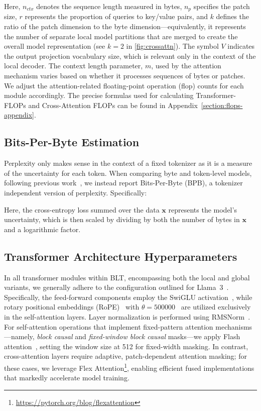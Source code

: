 Here, $n_{ctx}$ denotes the sequence length measured in bytes, $n_p$ specifies the patch size, $r$ represents the proportion of queries to key/value pairs, and $k$ defines the ratio of the patch dimension to the byte dimension—equivalently, it represents the number of separate local model partitions that are merged to create the overall model representation (see $k=2$ in \autoref{fig:crossattn}). The symbol $V$ indicates the output projection vocabulary size, which is relevant only in the context of the local decoder. The context length parameter, $m$, used by the attention mechanism varies based on whether it processes sequences of bytes or patches. We adjust the attention-related floating-point operation (flop) counts for each module accordingly. The precise formulas used for calculating Transformer-FLOPs and Cross-Attention FLOPs can be found in Appendix~\ref{section:flops-appendix}.

\subsection{Bits-Per-Byte Estimation} Perplexity only makes sense in the context of a fixed tokenizer as it is a measure of the uncertainty for each token. When comparing byte and token-level models, following previous work~\citep{xue2022byt5, yu2023megabyte, wang2024mambabyte}, we instead report Bits-Per-Byte (BPB), a tokenizer independent version of perplexity. Specifically:

Here, the cross-entropy loss summed over the data $\pmb{x}$ represents the model’s uncertainty, which is then scaled by dividing by both the number of bytes in $\pmb{x}$ and a logarithmic factor.

\subsection{Transformer Architecture Hyperparameters} In all transformer modules within {\textsc BLT}, encompassing both the local and global variants, we generally adhere to the configuration outlined for Llama~3~\citep{dubey2024llama}. Specifically, the feed-forward components employ the SwiGLU activation~\citep{swiglu}, while rotary positional embeddings (RoPE)~\citep{RoPe} with $\theta=500000$~\citep{xiong2024effective} are utilized exclusively in the self-attention layers. Layer normalization is performed using RMSNorm~\citep{RMSNorm}. For self-attention operations that implement fixed-pattern attention mechanisms—namely, \textit{block causal} and \textit{fixed-window block causal} masks—we apply Flash attention~\citep{dao2022flashattention}, setting the window size at 512 for fixed-width masking. In contrast, cross-attention layers require adaptive, patch-dependent attention masking; for these cases, we leverage Flex Attention\footnote{\url{https://pytorch.org/blog/flexattention}}, enabling efficient fused implementations that markedly accelerate model training.

